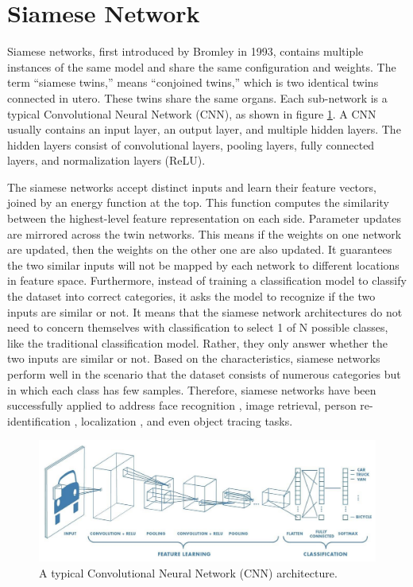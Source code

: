\section{Siamese Network}

Siamese networks, first introduced by Bromley \cite{bromley1993signature} in 1993, contains multiple instances of the same model and share the same configuration and weights. The term “siamese twins,” means “conjoined twins,” which is two identical twins connected in utero. These twins share the same organs. Each sub-network is a typical Convolutional Neural Network (CNN), as shown in figure \ref{fig:cnn}. A CNN usually contains an input layer, an output layer, and multiple hidden layers. The hidden layers consist of convolutional layers, pooling layers, fully connected layers, and normalization layers (ReLU). 

The siamese networks accept distinct inputs and learn their feature vectors, joined by an energy function at the top. This function computes the similarity between the highest-level feature representation on each side. Parameter updates are mirrored across the twin networks. This means if the weights on one network are updated, then the weights on the other one are also updated. It guarantees the two similar inputs will not be mapped by each network to different locations in feature space. Furthermore, instead of training a classification model to classify the dataset into correct categories, it asks the model to recognize if the two inputs are similar or not. It means that the siamese network architectures do not need to concern themselves with classification to select 1 of N possible classes, like the traditional classification model. Rather, they only answer whether the two inputs are similar or not. Based on the characteristics, siamese networks perform well in the scenario that the dataset consists of numerous categories but in which each class has few samples. Therefore, siamese networks have been successfully applied to address face recognition \cite{schroff2015facenet}, image retrieval, person re-identification \cite{fang2019bilinear}, localization \cite{tompson2015efficient}, and even object tracing \cite{bertinetto2016fully} tasks. 


\begin{figure}[h]
  \centering
  \includegraphics[width=\linewidth]{figs/cnn.png}
  \caption{A typical Convolutional Neural Network (CNN) architecture.}
  \label{fig:cnn}
\end{figure}

